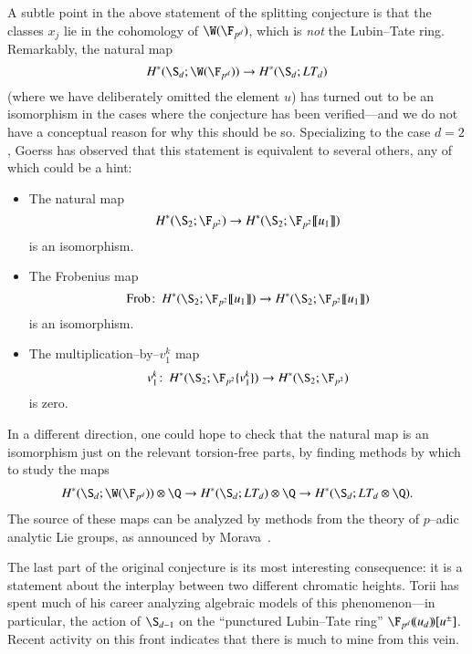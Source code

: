 A subtle point in the above statement of the splitting conjecture is that the classes $x_j$ lie in the cohomology of $\W(\F_{p^d})$, which is \emph{not} the Lubin--Tate ring.  Remarkably, the natural map \[H^*(\S_d; \W(\F_{p^d})) \to H^*(\S_d; LT_d)\] (where we have deliberately omitted the element $u$) has turned out to be an isomorphism in the cases where the conjecture has been verified---and we do not have a conceptual reason for why this should be so.  Specializing to the case $d = 2$, Goerss has observed that this statement is equivalent to several others, any of which could be a hint:
\begin{itemize}
    \item The natural map \[H^*(\S_2; \F_{p^2}) \to H^*(\S_2; \F_{p^2}\ps{u_1})\] is an isomorphism.
    \item The Frobenius map \[\Frob\co H^*(\S_2; \F_{p^2}\ps{u_1}) \to H^*(\S_2; \F_{p^2}\ps{u_1})\] is an isomorphism.
    \item The multiplication--by--$v_1^k$ map \[v_1^k\co H^*(\S_2; \F_{p^2}\{v_1^k\}) \to H^*(\S_2; \F_{p^2})\] is zero.
\end{itemize}
In a different direction, one could hope to check that the natural map is an isomorphism just on the relevant torsion-free parts, by finding methods by which to study the maps
\begin{align*}
H^*(\S_d; \W(\F_{p^d})) \otimes \Q \to H^*(\S_d; LT_d) \otimes \Q \to H^*(\S_d; LT_d \otimes \Q).
\end{align*}
The source of these maps can be analyzed by methods from the theory of $p$--adic analytic Lie groups, as announced by Morava~\cite[Remark 2.2.5]{MoravaCobordismComodules}.

The last part of the original conjecture is its most interesting consequence: it is a statement about the interplay between two different chromatic heights.  Torii has spent much of his career analyzing algebraic models of this phenomenon---in particular, the action of $\S_{d-1}$ on the ``punctured Lubin--Tate ring'' $\F_{p^d}(\!(u_d)\!)[u^\pm]$.  Recent activity on this front indicates that there is much to mine from this vein.

